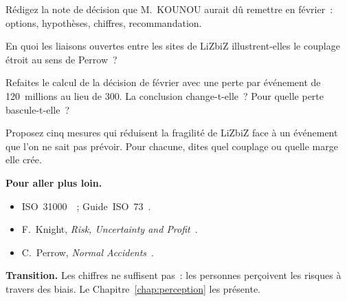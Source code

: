 \begin{boxexo}[title={\ding{45}\quad Exercice~1.7. Le dossier \niveaumoyen}]
Rédigez la note de décision que M.~KOUNOU aurait dû remettre en février~:
options, hypothèses, chiffres, recommandation.
\end{boxexo}

\begin{boxexo}[title={\ding{45}\quad Exercice~1.8. Couplage \niveaumoyen}]
En quoi les liaisons ouvertes entre les sites de LiZbiZ illustrent-elles
le couplage étroit au sens de Perrow~?
\end{boxexo}

\begin{boxexo}[title={\ding{45}\quad Exercice~1.9. Sensibilité \niveauexpert}]
Refaites le calcul de la décision de février avec une perte par
événement de 120~millions au lieu de 300. La conclusion change-t-elle~?
Pour quelle perte bascule-t-elle~?
\end{boxexo}

\begin{boxexo}[title={\ding{45}\quad Exercice~1.10. Fragilité \niveauexpert}]
Proposez cinq mesures qui réduisent la fragilité de LiZbiZ face à un
événement que l'on ne sait pas prévoir. Pour chacune, dites quel couplage
ou quelle marge elle crée.
\end{boxexo}

\bigskip

\begin{boxinfo}
\textbf{Pour aller plus loin.}
\begin{itemize}
    \item ISO~31000~\cite{iso31000_2018}~; Guide~ISO~73~\cite{isoguide73}.
    \item F.~Knight, \emph{Risk, Uncertainty and Profit}~\cite{knight1921}.
    \item C.~Perrow, \emph{Normal Accidents}~\cite{perrow1984}.
\end{itemize}
\end{boxinfo}

\begin{boxinfo}
\textbf{Transition.} Les chiffres ne suffisent pas~: les personnes perçoivent
les risques à travers des biais. Le Chapitre~\ref{chap:perception} les
présente.
\end{boxinfo}
